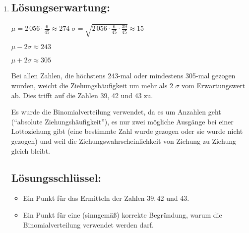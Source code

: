 \begin{langesbeispiel}
{\begin{enumerate}
\item \subsection{Lösungserwartung:}
			
		$\mu=2\,056\cdot\frac{6}{45}\approx 274$ \hspace{1cm} $\sigma=\sqrt{2\,056\cdot\frac{6}{45}\cdot\frac{39}{45}}\approx 15$
		
		$\mu-2\sigma\approx 243$
		
		$\mu+2\sigma\approx 305$
		
		Bei allen Zahlen, die höchstens 243-mal oder mindestens 305-mal gezogen wurden, weicht die Ziehungshäufigkeit um mehr als 2 $\sigma$ vom Erwartungswert ab. Dies trifft auf die Zahlen 39, 42 und 43 zu.
		
		Es wurde die Binomialverteilung verwendet, da es um Anzahlen geht ("`absolute Ziehungshäufigkeit"'), es nur zwei mögliche Ausgänge bei einer Lottoziehung gibt (eine bestimmte Zahl wurde gezogen oder sie wurde nicht gezogen) und weil die Ziehungswahrscheinlichkeit von Ziehung zu Ziehung gleich bleibt.
		
	\subsection{Lösungsschlüssel:}
	
\begin{itemize}
	\item  Ein Punkt für das Ermitteln der Zahlen $39,42$ und 43.
	\item  Ein Punkt für eine (sinngemäß) korrekte Begründung, warum die Binomialverteilung verwendet werden darf.

\end{itemize}
\end{enumerate}}
		\end{langesbeispiel}